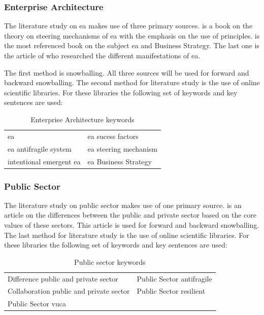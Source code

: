 \subsubsection{Enterprise Architecture}
\label{subsub:enterprisearchitecture}
The literature study on \acrshort{ea} makes use of three primary sources. \textcite{Greefhorst2011} is a book on the theory on steering mechanisms of \acrshort{ea} with the emphasis on the use of principles. \textcite{Ross2014} is the most referenced book on the subject \acrshort{ea} and Business Strategy. The last one is the article of \textcite{Lapalme2012} who researched the different manifestations of \acrshort{ea}.

The first method is snowballing. All three sources will be used for forward and backward snowballing. The second method for literature study is the use of online scientific libraries. For these libraries the following set of keywords and key sentences are used:
\bigskip

\begin{table}[H]
	\centering
\begin{tabular}{p{}p{}}
	\toprule
	\acrlong{ea} & \acrlong{ea} sucess factors\\%
	\acrlong{ea} \gls{antifragile} system	& \acrlong{ea} steering mechanism\\%
	intentional emergent \acrlong{ea} & \acrlong{ea} Business Strategy\\%
	\bottomrule
\end{tabular}
	\caption{Enterprise Architecture keywords}
\end{table}

\subsubsection{Public Sector}
\label{subsub:publicsector}
The literature study on public sector makes use of one primary source. \textcite{Wal2008} is an article on the differences between the public and private sector based on the core values of these sectors. This article is used for forward and backward snowballing. The last method for literature study is the use of online scientific libraries. For these libraries the following set of keywords and key sentences are used:
\bigskip

\begin{table}[H]
	\centering
	\begin{tabular}{p{}p{}}
		\toprule
		Difference public and private sector &	Public Sector \gls{antifragile}\\%
		Collaboration public and private sector & Public Sector \gls{resilient}\\%
		Public Sector \acrshort{vuca} & \\%
		\bottomrule
	\end{tabular}
	\caption{Public sector keywords}
\end{table}

